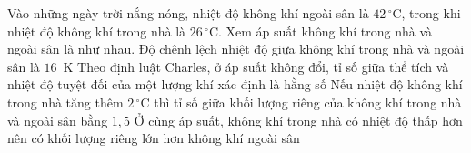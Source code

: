 	\begin{ex}%
		Vào những ngày trời nắng nóng, nhiệt độ không khí ngoài sân là $42\,^\circ\text{C}$, trong khi nhiệt độ không khí trong nhà là $26\,^\circ\text{C}$. Xem áp suất không khí trong nhà và ngoài sân là như nhau.
		\choiceTFt
		{\True Độ chênh lệch nhiệt độ giữa không khí trong nhà và ngoài sân là $16$~K}
		{\True Theo định luật Charles, ở áp suất không đổi, tỉ số giữa thể tích và nhiệt độ tuyệt đối của một lượng khí xác định là hằng số}
		{Nếu nhiệt độ không khí trong nhà tăng thêm $2\,^\circ\text{C}$ thì tỉ số giữa khối lượng riêng của không khí trong nhà và ngoài sân bằng $1{,}5$}
		{\True Ở cùng áp suất, không khí trong nhà có nhiệt độ thấp hơn nên có khối lượng riêng lớn hơn không khí ngoài sân}
	\end{ex}

